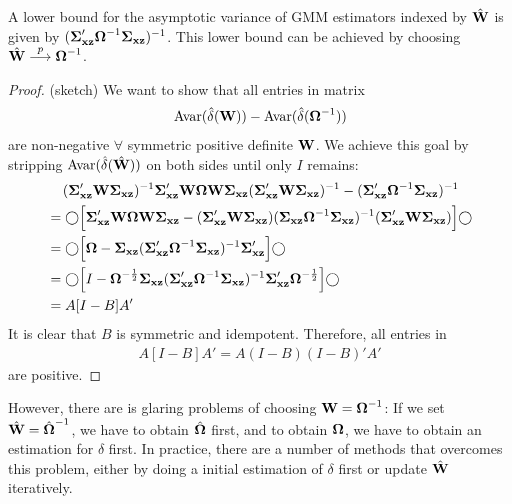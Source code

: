 \documentclass{article}
\begin{document}
\begin{proposition}
	A lower bound for the asymptotic variance of GMM estimators indexed by $\hat{\mathbf{W}}$
	is given by $(\boldsymbol{\Sigma}_{\mathbf{x}\mathbf{z}}'\boldsymbol{\Omega}^{-1}\boldsymbol{\Sigma}_{\mathbf{x}\mathbf{z}})^{-1}$.
	This lower bound can be achieved by choosing $\hat{\mathbf{W}}\overset{p}{\longrightarrow}\boldsymbol{\Omega}^{-1}$.
\end{proposition}
\begin{proof}(sketch)
	We want to show that all entries in matrix
	\begin{align*}
		\mathrm{Avar}(\hat{\delta}(\mathbf{W}))-\mathrm{Avar}(\hat{\delta}(\boldsymbol{\Omega}^{-1}))
	\end{align*}
	are non-negative $\forall$ symmetric positive definite $\mathbf{W}$.
	We achieve this goal by stripping $\mathrm{Avar}(\hat{\delta}(\hat{\mathbf{W}}))$ on both sides until
	only $I$ remains:
	\begin{align*}
		&\raum (\SIGMA_{\xx\zz}'\WW\SIGMA_{\xx\zz})\inv
		\SIGMA_{\xx\zz}'\WW\OMEGA\WW\SIGMA_{\xx\zz}
		(\SIGMA_{\xx\zz}'\WW\SIGMA_{\xx\zz})\inv
		- (\SIGMA_{\xx\zz}'\OMEGA\inv\SIGMA_{\xx\zz})\inv \\
		&= \bigcirc\Big[\SIGMA_{\xx\zz}'\WW\OMEGA\WW\SIGMA_{\xx\zz}-(\SIGMA_{\xx\zz}'\WW\SIGMA_{\xx\zz})(\SIGMA_{\xx\zz}\OMEGA\inv\SIGMA_{\xx\zz})\inv(\SIGMA_{\xx\zz}'\WW\SIGMA_{\xx\zz})\Big]\bigcirc \\
		&= \bigcirc\Big[\OMEGA-\SIGMA_{\xx\zz}(\SIGMA_{\xx\zz}'\OMEGA\inv\SIGMA_{\xx\zz})\inv\SIGMA_{\xx\zz}'\Big]\bigcirc \\
		&= \bigcirc\Big[I - \OMEGA^{-\frac12}\SIGMA_{\xx\zz}(\SIGMA_{\xx\zz}'\OMEGA\inv\SIGMA_{\xx\zz})\inv\SIGMA_{\xx\zz}'\OMEGA^{-\frac12}\Big]\bigcirc \\
		&= A[I-B]A'
	\end{align*}
	It is clear that $B$ is symmetric and idempotent.
	Therefore, all entries in
	\begin{align*}
		A[I-B]A' = A(I-B)(I-B)'A'
	\end{align*}
	are positive.
\end{proof}

However, there are is glaring problems of choosing $\mathbf{W}=\boldsymbol{\Omega}^{-1}$:
If we set $\hat{\mathbf{W}}=\hat{\boldsymbol{\Omega}}^{-1}$,
we have to obtain $\hat{\boldsymbol{\Omega}}$ first,
and to obtain $\boldsymbol{\Omega}$,
we have to obtain an estimation for $\delta$ first.
In practice, there are a number of methods that overcomes this problem,
either by doing a initial estimation of $\delta$ first or update $\hat{\mathbf{W}}$ iteratively.
\end{document}
